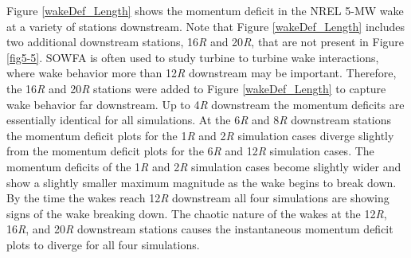 Figure \ref{wakeDef_Length} shows the momentum deficit in the NREL 5-MW wake at a variety of stations downstream. Note that Figure \ref{wakeDef_Length} includes two additional downstream stations, 16\emph{R} and 20\emph{R}, that are not present in Figure \ref{fig5-5}. SOWFA is often used to study turbine to turbine wake interactions, where wake behavior more than 12\emph{R} downstream may be important. Therefore, the 16\emph{R} and 20\emph{R} stations were added to Figure \ref{wakeDef_Length} to capture wake behavior far downstream.  Up to 4\emph{R} downstream the momentum deficits are essentially identical for all simulations. At the 6\emph{R} and 8\emph{R} downstream stations the momentum deficit plots for the 1\emph{R} and 2\emph{R} simulation cases diverge slightly from the momentum deficit plots for the 6\emph{R} and 12\emph{R} simulation cases. The momentum deficits of the 1\emph{R} and 2\emph{R} simulation cases become slightly wider and show a slightly smaller maximum magnitude as the wake begins to break down. By the time the wakes reach  12\emph{R} downstream all four simulations are showing signs of the wake breaking down. The chaotic nature of the wakes at the 12\emph{R}, 16\emph{R}, and 20\emph{R} downstream stations causes the instantaneous momentum deficit plots to diverge for all four simulations.


